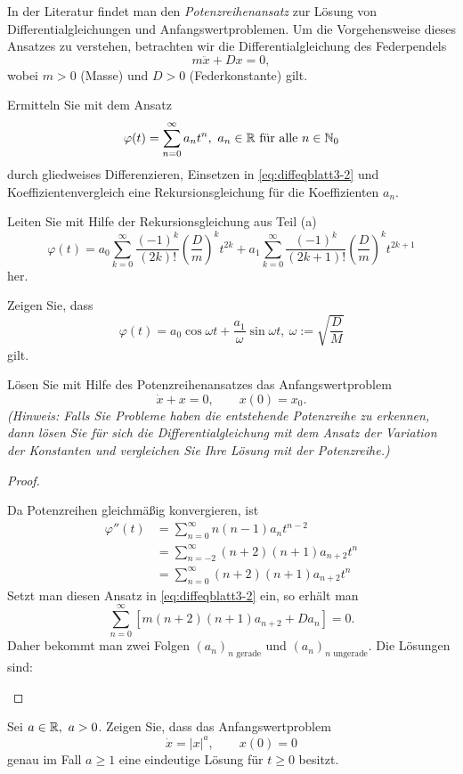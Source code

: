 \begin{Problem}
	In der Literatur findet man den \emph{Potenzreihenansatz} zur L\"{o}sung von Differentialgleichungen und Anfangswertproblemen. Um die Vorgehensweise dieses Ansatzes zu verstehen, betrachten wir die Differentialgleichung des Federpendels
	\begin{equation}\label{eq:diffeqblatt3-2}
		m\ddot{x}+Dx=0,
	\end{equation}
	wobei $m>0$ (Masse) und $D>0$ (Federkonstante) gilt.
	\begin{parts}
	\item Ermitteln Sie mit dem Ansatz
		\[
			\varphi(t)=\sum_{n=0}^{\infty} a_n t^n,~a_n\in \mathbb{R}~\text{f\"{u}r alle }n\in \mathbb{N}_0
		\] 
		durch gliedweises Differenzieren, Einsetzen in \eqref{eq:diffeqblatt3-2} und Koeffizientenvergleich eine Rekursionsgleichung f\"{u}r die Koeffizienten $a_n$.
	\item Leiten Sie mit Hilfe der Rekursionsgleichung aus Teil (a)
		\[
			\varphi(t)=a_0 \sum_{k=0}^{\infty} \frac{(-1)^k}{(2k)!}\left(\frac{D}{m}\right)^k t^{2k}+a_1 \sum_{k=0}^{\infty} \frac{(-1)^k}{(2k+1)!}\left( \frac{D}{m} \right)^k t^{2k+1}
		\]
		her.
	\item Zeigen Sie, dass
\[
\varphi(t)=a_0 \cos\omega t + \frac{a_1}{\omega}\sin \omega t,~\omega:=\sqrt{\frac{D}{M}} 
\]
gilt.
\item L\"{o}sen Sie mit Hilfe des Potenzreihenansatzes das Anfangswertproblem
	\[
		\dot{x}+x=0,\qquad x(0)=x_0
	.\] 
	\emph{(Hinweis: Falls Sie Probleme haben die entstehende Potenzreihe zu erkennen, dann lösen Sie für sich die Differentialgleichung mit dem Ansatz der Variation der Konstanten und vergleichen Sie Ihre Lösung mit der Potenzreihe.)} 
	\end{parts}
\end{Problem}
\begin{proof}
	\begin{parts}
		\item Da Potenzreihen gleichmäßig konvergieren, ist
		\begin{align*}
		\varphi''(t)&=\sum_{n=0}^\infty n(n-1)a_n t^{n-2}\\
		&=\sum_{n=-2}^\infty (n+2)(n+1)a_{n+2}t^n\\
		&=\sum_{n=0}^\infty (n+2)(n+1)a_{n+2}t^n
	\end{align*}
	Setzt man diesen Ansatz in \eqref{eq:diffeqblatt3-2} ein, so erhält man
	\[\sum_{n=0}^\infty\left[m(n+2)(n+1)a_{n+2}+Da_n\right]=0.\]
	Daher bekommt man zwei Folgen $(a_n)_{n\text{ gerade}}$ und $(a_n)_{n\text{ ungerade}}$. Die L\"{o}sungen sind:
	\end{parts}
\end{proof}
\begin{Problem}
	Sei $a\in \mathbb{R},~a>0$. Zeigen Sie, dass das Anfangswertproblem
	\[
		\dot{x}=|x|^a,\qquad x(0)=0
	\]
	genau im Fall $a\ge 1$ eine eindeutige L\"{o}sung f\"{u}r $t\ge 0$ besitzt.
\end{Problem}
